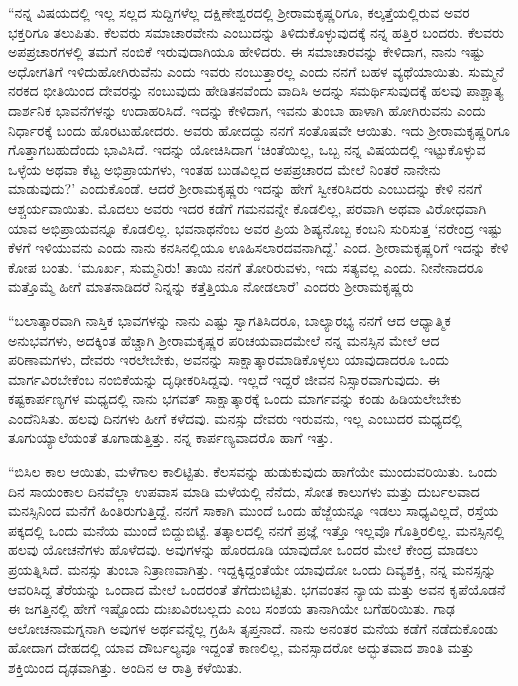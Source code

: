 “ನನ್ನ ವಿಷಯದಲ್ಲಿ ಇಲ್ಲ ಸಲ್ಲದ ಸುದ್ದಿಗಳೆಲ್ಲ ದಕ್ಷಿಣೇಶ್ವರದಲ್ಲಿ ಶ‍್ರೀರಾಮಕೃಷ್ಣರಿಗೂ, ಕಲ್ಕತ್ತೆಯಲ್ಲಿರುವ ಅವರ ಭಕ್ತರಿಗೂ ತಲುಪಿತು. ಕೆಲವರು ಸಮಾಚಾರವೇನು ಎಂಬುದನ್ನು ತಿಳಿದುಕೊಳ್ಳುವುದಕ್ಕೆ ನನ್ನ ಹತ್ತಿರ ಬಂದರು. ಕೆಲವರು ಅಪಪ್ರಚಾರಗಳಲ್ಲಿ ತಮಗೆ ನಂಬಿಕೆ ಇರುವುದಾಗಿಯೂ ಹೇಳಿದರು. ಈ ಸಮಾಚಾರವನ್ನು ಕೇಳಿದಾಗ, ನಾನು ಇಷ್ಟು ಅಧೋಗತಿಗೆ ಇಳಿದುಹೋಗಿರುವೆನು ಎಂದು ಇವರು ನಂಬುತ್ತಾರಲ್ಲ ಎಂದು ನನಗೆ ಬಹಳ ವ್ಯಥೆಯಾಯಿತು. ಸುಮ್ಮನೆ ನರಕದ ಭೀತಿಯಿಂದ ದೇವರನ್ನು ನಂಬುವುದು ಹೇಡಿತನವೆಂದು ವಾದಿಸಿ ಅದನ್ನು ಸಮರ್ಥಿಸುವುದಕ್ಕೆ ಹಲವು ಪಾಶ್ಚಾತ್ಯ ದಾರ್ಶನಿಕ ಭಾವನೆಗಳನ್ನು ಉದಾಹರಿಸಿದೆ. ಇದನ್ನು ಕೇಳಿದಾಗ, ಇವನು ತುಂಬಾ ಹಾಳಾಗಿ ಹೋಗಿರುವನು ಎಂದು ನಿರ್ಧಾರಕ್ಕೆ ಬಂದು ಹೊರಟುಹೋದರು. ಅವರು ಹೋದದ್ದು ನನಗೆ ಸಂತೊಷವೇ ಆಯಿತು. ಇದು ಶ‍್ರೀರಾಮಕೃಷ್ಣರಿಗೂ ಗೊತ್ತಾಗಬಹುದೆಂದು ಭಾವಿಸಿದೆ. ಇದನ್ನು ಯೋಚಿಸಿದಾಗ ‘ಚಿಂತೆಯಿಲ್ಲ, ಒಬ್ಬ ನನ್ನ ವಿಷಯದಲ್ಲಿ ಇಟ್ಟುಕೊಳ್ಳುವ ಒಳ್ಳೆಯ ಅಥವಾ ಕೆಟ್ಟ ಅಭಿಪ್ರಾಯಗಳು, ಇಂತಹ ಬುಡವಿಲ್ಲದ ಅಪಪ್ರಚಾರದ ಮೇಲೆ ನಿಂತರೆ ನಾನೇನು ಮಾಡುವುದು?’ ಎಂದುಕೊಂಡೆ. ಆದರೆ ಶ‍್ರೀರಾಮಕೃಷ್ಣರು ಇದನ್ನು ಹೇಗೆ ಸ್ವೀಕರಿಸಿದರು ಎಂಬುದನ್ನು ಕೇಳಿ ನನಗೆ ಆಶ್ಚರ್ಯವಾಯಿತು. ಮೊದಲು ಅವರು ಇದರ ಕಡೆಗೆ ಗಮನವನ್ನೇ ಕೊಡಲಿಲ್ಲ, ಪರವಾಗಿ ಅಥವಾ ವಿರೋಧವಾಗಿ ಯಾವ ಅಭಿಪ್ರಾಯವನ್ನೂ ಕೊಡಲಿಲ್ಲ. ಭವನಾಥನೆಂಬ ಅವರ ಪ್ರಿಯ ಶಿಷ್ಯನೊಬ್ಬ ಕಂಬನಿ ಸುರಿಸುತ್ತ ‘ನರೇಂದ್ರ ಇಷ್ಟು ಕೆಳಗೆ ಇಳಿಯುವನು ಎಂದು ನಾನು ಕನಸಿನಲ್ಲಿಯೂ ಊಹಿಸಲಾರದವನಾಗಿದ್ದೆ.’ ಎಂದ. ಶ‍್ರೀರಾಮಕೃಷ್ಣರಿಗೆ ಇದನ್ನು ಕೇಳಿ ಕೋಪ ಬಂತು. ‘ಮೂರ್ಖ, ಸುಮ್ಮನಿರು! ತಾಯಿ ನನಗೆ ತೋರಿರುವಳು, ಇದು ಸತ್ಯವಲ್ಲ ಎಂದು. ನೀನೇನಾದರೂ ಮತ್ತೊಮ್ಮೆ ಹೀಗೆ ಮಾತನಾಡಿದರೆ ನಿನ್ನನ್ನು ಕತ್ತೆತ್ತಿಯೂ ನೋಡಲಾರೆ’ ಎಂದರು ಶ‍್ರೀರಾಮಕೃಷ್ಣರು

“ಬಲಾತ್ಕಾರವಾಗಿ ನಾಸ್ತಿಕ ಭಾವಗಳನ್ನು ನಾನು ಎಷ್ಟು ಸ್ವಾಗತಿಸಿದರೂ, ಬಾಲ್ಯಾರಭ್ಯ ನನಗೆ ಆದ ಆಧ್ಯಾತ್ಮಿಕ ಅನುಭವಗಳು, ಅದಕ್ಕಿಂತ ಹೆಚ್ಚಾಗಿ ಶ‍್ರೀರಾಮಕೃಷ್ಣರ ಪರಿಚಯವಾದಮೇಲೆ ನನ್ನ ಮನಸ್ಸಿನ ಮೇಲೆ ಆದ ಪರಿಣಾಮಗಳು, ದೇವರು ಇರಲೇಬೇಕು, ಅವನನ್ನು ಸಾಕ್ಷಾತ್ಕಾರಮಾಡಿಕೊಳ್ಳಲು ಯಾವುದಾದರೂ ಒಂದು ಮಾರ್ಗವಿರಬೇಕೆಂಬ ನಂಬಿಕೆಯನ್ನು ದೃಢೀಕರಿಸಿದ್ದವು. ಇಲ್ಲದೆ ಇದ್ದರೆ ಜೀವನ ನಿಸ್ಸಾರವಾಗುವುದು. ಈ ಕಷ್ಟಕಾರ್ಪಣ್ಯಗಳ ಮಧ್ಯದಲ್ಲಿ ನಾನು ಭಗವತ್ ಸಾಕ್ಷಾತ್ಕಾರಕ್ಕೆ ಒಂದು ಮಾರ್ಗವನ್ನು ಕಂಡು ಹಿಡಿಯಲೇಬೇಕು ಎಂದೆನಿಸಿತು. ಹಲವು ದಿನಗಳು ಹೀಗೆ ಕಳೆದವು. ಮನಸ್ಸು ದೇವರು ಇರುವನು, ಇಲ್ಲ ಎಂಬುದರ ಮಧ್ಯದಲ್ಲಿ ತೂಗುಯ್ಯಾಲೆಯಂತೆ ತೂಗಾಡುತ್ತಿತ್ತು. ನನ್ನ ಕಾರ್ಪಣ್ಯವಾದರೊ ಹಾಗೆ ಇತ್ತು.

“ಬಿಸಿಲ ಕಾಲ ಆಯಿತು, ಮಳೆಗಾಲ ಕಾಲಿಟ್ಟಿತು. ಕೆಲಸವನ್ನು ಹುಡುಕುವುದು ಹಾಗೆಯೇ ಮುಂದುವರಿಯಿತು. ಒಂದು ದಿನ ಸಾಯಂಕಾಲ ದಿನವೆಲ್ಲಾ ಉಪವಾಸ ಮಾಡಿ ಮಳೆಯಲ್ಲಿ ನೆನೆದು, ಸೋತ ಕಾಲುಗಳು ಮತ್ತು ದುರ್ಬಲವಾದ ಮನಸ್ಸಿನಿಂದ ಮನೆಗೆ ಹಿಂತಿರುಗುತ್ತಿದ್ದೆ. ನನಗೆ ಸಾಕಾಗಿ ಮುಂದೆ ಒಂದು ಹೆಜ್ಜೆಯನ್ನೂ ಇಡಲು ಸಾಧ್ಯವಿಲ್ಲದೆ, ರಸ್ತೆಯ ಪಕ್ಕದಲ್ಲಿ ಒಂದು ಮನೆಯ ಮುಂದೆ ಬಿದ್ದುಬಿಟ್ಟೆ. ತತ್ಕಾಲದಲ್ಲಿ ನನಗೆ ಪ್ರಜ್ಞೆ ಇತ್ತೊ ಇಲ್ಲವೊ ಗೊತ್ತಿರಲಿಲ್ಲ. ಮನಸ್ಸಿನಲ್ಲಿ ಹಲವು ಯೋಚನೆಗಳು ಹೊಳೆದವು. ಅವುಗಳನ್ನು ಹೊರದೂಡಿ ಯಾವುದೋ ಒಂದರ ಮೇಲೆ ಕೇಂದ್ರ ಮಾಡಲು ಪ್ರಯತ್ನಿಸಿದೆ. ಮನಸ್ಸು ತುಂಬಾ ನಿತ್ರಾಣವಾಗಿತ್ತು. ಇದ್ದಕ್ಕಿದ್ದಂತೆಯೇ ಯಾವುದೋ ಒಂದು ದಿವ್ಯಶಕ್ತಿ, ನನ್ನ ಮನಸ್ಸನ್ನು ಆವರಿಸಿದ್ದ ತೆರೆಯನ್ನು ಒಂದಾದ ಮೇಲೆ ಒಂದರಂತೆ ತೆಗೆದುಬಿಟ್ಟಿತು. ಭಗವಂತನ ನ್ಯಾಯ ಮತ್ತು ಅವನ ಕೃಪೆಯೊಡನೆ ಈ ಜಗತ್ತಿನಲ್ಲಿ ಹೇಗೆ ಇಷ್ಟೊಂದು ದುಃಖವಿರಬಲ್ಲದು ಎಂಬ ಸಂಶಯ ತಾನಾಗಿಯೇ ಬಗೆಹರಿಯಿತು. ಗಾಢ ಆಲೋಚನಾಮಗ್ನನಾಗಿ ಅವುಗಳ ಅರ್ಥವನ್ನೆಲ್ಲ ಗ್ರಹಿಸಿ ತೃಪ್ತನಾದೆ. ನಾನು ಅನಂತರ ಮನೆಯ ಕಡೆಗೆ ನಡೆದುಕೊಂಡು ಹೋದಾಗ ದೇಹದಲ್ಲಿ ಯಾವ ದೌರ್ಬಲ್ಯವೂ ಇದ್ದಂತೆ ಕಾಣಲಿಲ್ಲ, ಮನಸ್ಸಾದರೋ ಅದ್ಭುತವಾದ ಶಾಂತಿ ಮತ್ತು ಶಕ್ತಿಯಿಂದ ದೃಢವಾಗಿತ್ತು. ಅಂದಿನ ಆ ರಾತ್ರಿ ಕಳೆಯಿತು.

